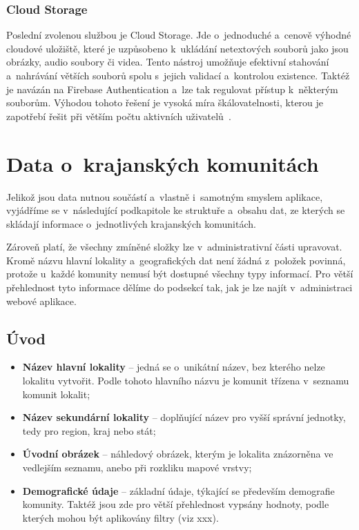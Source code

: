 \hypertarget{cloud-storage}{%
\subsubsection{Cloud Storage}\label{cloud-storage}}

Poslední zvolenou službou je Cloud Storage. Jde o~jednoduché a~cenově výhodné cloudové uložiště, které je uzpůsobeno k~ukládání netextových souborů jako jsou obrázky, audio soubory či videa. Tento nástroj umožňuje efektivní stahování a~nahrávání větších souborů spolu s~jejich validací a~kontrolou existence. Taktéž je navázán na Firebase Authentication a~lze tak regulovat přístup k~některým souborům. Výhodou tohoto řešení je vysoká míra škálovatelnosti, kterou je zapotřebí řešit při větším počtu aktivních uživatelů~\parencite{storage}.

\hypertarget{data-o-krajanskuxfdch-komunituxe1ch}{%
\section{Data o~krajanských komunitách}\label{data-o-krajanskuxfdch-komunituxe1ch}}

Jelikož jsou data nutnou součástí a~vlastně i~samotným smyslem aplikace, vyjádříme se v~následující podkapitole ke struktuře a~obsahu dat, ze kterých se skládají informace o~jednotlivých krajanských komunitách.

Zároveň platí, že všechny zmíněné složky lze v~administrativní části upravovat. Kromě názvu hlavní lokality a~geografických dat není žádná z~položek povinná, protože u~každé komunity nemusí být dostupné všechny typy informací. Pro větší přehlednost tyto informace dělíme do podsekcí tak, jak je lze najít v~administraci webové aplikace.

\hypertarget{uxfavod}{%
\subsection{Úvod}\label{uxfavod}}

\begin{itemize}
\tightlist
\item
  \textbf{Název hlavní lokality} -- jedná se o~unikátní název, bez kterého nelze lokalitu vytvořit. Podle tohoto hlavního názvu je komunit třízena v~seznamu komunit lokalit;
\item
  \textbf{Název sekundární lokality } -- doplňující název pro vyšší správní jednotky, tedy pro region, kraj nebo stát;
\item
  \textbf{Úvodní obrázek} -- náhledový obrázek, kterým je lokalita znázorněna ve vedlejším seznamu, anebo při rozkliku mapové vrstvy;
\item
  \textbf{Demografické údaje} -- základní údaje, týkající se především demografie komunity. Taktéž jsou zde pro větší přehlednost vypsány hodnoty, podle kterých mohou být aplikovány filtry (viz xxx).
\end{itemize}

